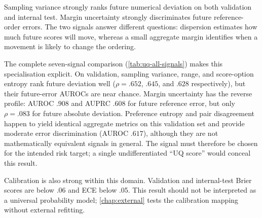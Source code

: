 \documentclass[11pt,twoside,a4paper]{report}
\begin{document}
Sampling variance strongly ranks future numerical deviation on both validation and
internal test.  Margin uncertainty strongly discriminates future reference-order
errors.  The two signals answer different questions: dispersion estimates how much
future scores will move, whereas a small aggregate margin identifies when a movement
is likely to change the ordering.

The complete seven-signal comparison (\cref{tab:uq-all-signals}) makes this
specialisation explicit.  On validation, sampling variance, range, and score-option
entropy rank future deviation well ($\rho=.652$, $.645$, and $.628$ respectively),
but their future-error AUROCs are near chance.  Margin uncertainty has the reverse
profile: AUROC $.908$ and AUPRC $.608$ for future reference error, but only
$\rho=.083$ for future absolute deviation.  Preference entropy and pair disagreement
happen to yield identical aggregate metrics on this validation set and provide
moderate error discrimination (AUROC $.617$), although they are not mathematically
equivalent signals in general.  The signal must therefore be chosen for the intended
risk target; a single undifferentiated ``UQ score'' would conceal this result.

Calibration is also strong within this domain.  Validation and internal-test Brier
scores are below .06 and ECE below .05.  This result should not be interpreted as a
universal probability model; \cref{chap:external} tests the calibration mapping
without external refitting.
\end{document}
